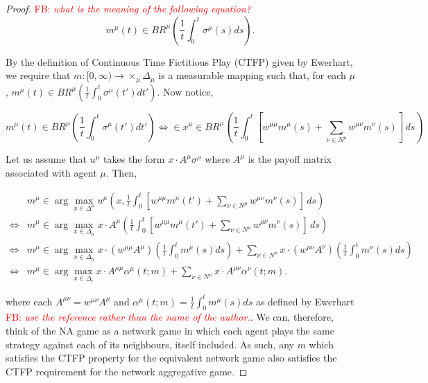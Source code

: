 \documentclass{article}
\theoremstyle{definition}
\newcommand{\fb}[1]{\textcolor{red}{FB: \textit{#1}}}
\newcommand{\wmunu}{w^{\mu \nu}}
\begin{document}
  \begin{proof}

   \fb{what is the meaning of the following equation?}
%
    \begin{equation}
      m^\mu(t) \in BR^\mu \left( \frac{1}{t} \int_{0}^{t} \sigma^\mu(s) ds \right).
    \end{equation}
    
    By the definition of Continuous Time Fictitious Play (CTFP) given by Ewerhart, we require that $m: [0, \infty) \rightarrow \times_\mu \Delta_\mu$ is a measurable mapping such that, for each $\mu$, $m^\mu(t) \in BR^\mu \left( \frac{1}{t} \int_{0}^{t} \sigma^\mu(t') dt' \right)$. Now notice,
    
    \begin{equation*}
      m^\mu(t) \in BR^\mu \left( \frac{1}{t} \int_{0}^{t} \sigma^\mu(t') dt' \right) \iff  \in x^\mu\in BR^\mu \left( \frac{1}{t} \int_{0}^{t} [w^{\mu \mu} m^\mu(s) + \sum_{\nu \in N^\mu} w^{\mu \nu} m^\nu(s)] \, ds \right)
    \end{equation*}
    
    Let us assume that $u^\mu$ takes the form $x \cdot A^\mu \sigma^\mu$ where $A^\mu$ is the payoff matrix associated with agent $\mu$. Then,
    
    \begin{align}
      & m^\mu \in \arg\max_{x \in \Delta^\mu} u^\mu(x,\frac{1}{t} \int_{0}^{t} [w^{\mu \mu} m^\mu(t') + \sum_{\nu \in N^\mu} w^{\mu \nu} m^\nu(s)] \, ds) \nonumber \\
      \iff & m^\mu \in \arg\max_{x \in \Delta_\mu} x \cdot A^\mu \left(\frac{1}{t} \int_{0}^{t} [w^{\mu \mu} m^\mu(t') + \sum_{\nu \in N^\mu} w^{\mu \nu} m^\nu(s)] \, ds \right) \nonumber \\
      \iff & m^\mu \in \arg \max_{x \in \Delta_\mu} x \cdot (w^{\mu \mu} A^\mu) \left( \frac{1}{t} \int_{0}^{t} m^\mu(s) ds\right) + \sum_{\nu \in N^\mu} x \cdot (\wmunu A^\nu) \left( \frac{1}{t} \int_{0}^{t} m^\nu(s) ds \right) \nonumber \\
      \iff & m^\mu \in \arg \max_{x \in \Delta_i} x \cdot A^{\mu \mu} \alpha^\mu(t; m) + \sum_{\nu \in N^\mu} x \cdot A^{\mu \nu} \alpha^\nu(t; m).
    \end{align}
    
    where each $A^{\mu \nu} = \wmunu A^\mu$ and $\alpha^\mu(t; m)
    =\frac{1}{t} \int_{0}^{t} m^\mu(s) ds$ as defined by Ewerhart \fb{use the reference rather than the name of the author.}. We
    can, therefore, think of the NA game as a network game in which
    each agent plays the same strategy against each of its neighbours,
    itself included. As such, any $m$ which satisfies the CTFP
    property for the equivalent network game also satisfies the CTFP
    requirement for the network aggregative game.
    

\end{proof}
\end{document}

